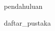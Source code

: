 \documentclass[oneside,12pt, a4paper]{book}
\numberwithin{equation}{chapter}
\begin{document}
\begin{doublespace}


\clearpage
{pendahuluan}






\clearpage
{daftar_pustaka}


%
%
%
%
%
%


\end{doublespace}

\clearpage
\end{document}

